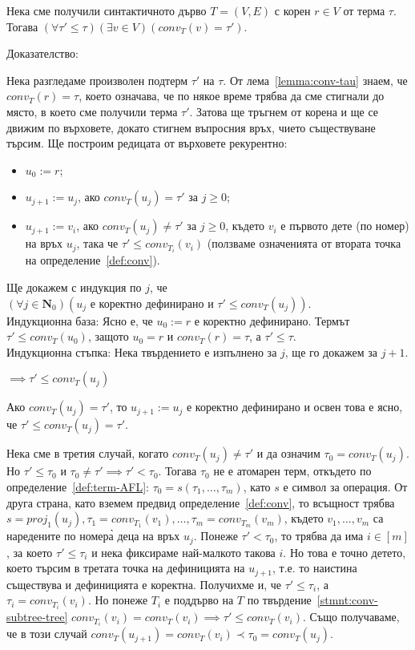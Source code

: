 \documentclass[12pt,twoside,a4paper]{article}
\begin{document}
	\begin{statement}\label{stmnt:subterm-subtree} Нека сме получили синтактичното дърво $T=(V,E)$ с корен $r \in V$ от терма $\tau$. Тогава $(\forall \tau' \le \tau)(\exists v \in V)(conv_T(v) = \tau')$.
		
		\noindent Доказателство:
		
		Нека разгледаме произволен подтерм $\tau'$ на $\tau$. От лема~\ref{lemma:conv-tau} знаем, че $conv_T(r) = \tau$, което означава, че по някое време трябва да сме стигнали до място, в което сме получили терма $\tau'$. Затова ще тръгнем от корена и ще се движим по върховете, докато стигнем въпросния връх, чието съществуване търсим. Ще построим редицата от върховете рекурентно:
		\begin{itemize}
			\item $u_0:=r$;
			\item $u_{j+1} := u_j$, ако $conv_T(u_j) = \tau'$ за $j \ge 0$;
			\item $u_{j+1} := v_i$, ако $conv_T(u_j) \neq \tau'$ за $j \ge 0$, където $v_i$ е първото дете (по номер) на връх $u_j$, така че $\tau' \leq conv_{T_i}(v_i)$ (ползваме означенията от втората точка на определение~\ref{def:conv}).
		\end{itemize}
		Ще докажем с индукция по $j$, че $(\forall j \in \mathbf{N}_0)(u_j\text{ е коректно дефинирано и } \tau' \leq conv_T(u_j))$.\\
		\indent Индукционна база: Ясно е, че $u_0 := r$ е коректно дефинирано. Термът $\tau' \le conv_T(u_0)$, защото $u_0 = r$ и $conv_T(r) = \tau$, а $\tau' \le \tau$.\\
		\indent Индукционна стъпка: Нека твърдението е изпълнено за $j$, ще го докажем за $j+1$.
		
		\noindent$\implies \tau' \leq conv_T(u_j)$
		
		Ако $conv_T(u_j) = \tau'$, то $u_{j+1}:=u_j$ е коректно дефинирано и освен това е ясно, че $\tau' \leq conv_T(u_j) = \tau'$.
		
		Нека сме в третия случай, когато $conv_T(u_j) \neq \tau'\text{ и да означим }\tau_0 = conv_T(u_j)$. Но $\tau' \leq \tau_0$ и $\tau_0 \neq \tau' \implies \tau' < \tau_0$. Тогава $\tau_0$ не е атомарен терм, откъдето по определение~\ref{def:term-AFL}: $\tau_0 = s(\tau_1, \dots, \tau_m)$, като $s$ е символ за операция. От друга страна, като вземем предвид определение~\ref{def:conv}, то всъщност трябва $s = proj_1(u_j), \tau_1 = conv_{T_1}(v_1), \dots, \tau_m = conv_{T_m}(v_m)$, където $v_1, ..., v_m$ са наредените по номера̀ деца на връх $u_j$. Понеже $\tau' < \tau_0$, то трябва да има $i \in [m]$, за което $\tau' \leq \tau_i$ и нека фиксираме най-малкото такова $i$. Но това е точно детето, което търсим в третата точка на дефиницията на $u_{j+1}$, т.е. то наистина съществува и дефиницията е коректна. Получихме и, че $\tau' \leq \tau_i$, а $\tau_i = conv_{T_i}(v_i)$. Но понеже $T_i$ е поддърво на $T$ по твърдение~\ref{stmnt:conv-subtree-tree} $conv_{T_i}(v_i) = conv_T(v_i) \implies \tau' \leq conv_T(v_i)$. Също получаваме, че в този случай $conv_T(u_{j+1})=conv_T(v_i) \prec \tau_0 = conv_T(u_j)$.
		

\end{statement}
\end{document}
